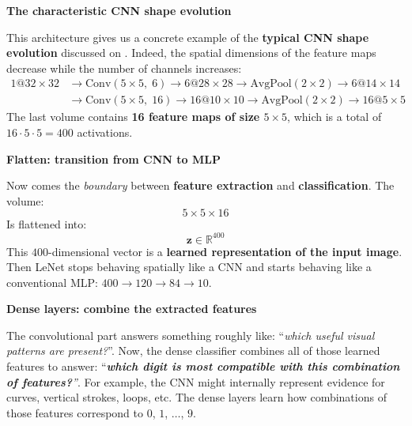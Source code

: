 \highspace
\begin{flushleft}
    \textcolor{Green3}{ \textbf{The characteristic CNN shape evolution}}
\end{flushleft}
This architecture gives us a concrete example of the \textbf{typical CNN shape evolution} discussed on . Indeed, the spatial dimensions of the feature maps decrease while the number of channels increases:
\begin{align*}
    1@32\times32 &\to \text{Conv}(5 \times 5, \; 6) \to 6@28\times28 \to \text{AvgPool}(2 \times 2) \to 6@14\times14 \\
    &\to \text{Conv}(5 \times 5, \; 16) \to 16@10\times10 \to \text{AvgPool}(2 \times 2) \to \boxed{16@5\times5}
\end{align*}
The last volume contains \textbf{16 feature maps of size $5\times5$}, which is a total of $16 \cdot 5 \cdot 5 = 400$ activations.

\highspace
\begin{flushleft}
    \textcolor{Green3}{ \textbf{Flatten: transition from CNN to MLP}}
\end{flushleft}
Now comes the \emph{boundary} between \textbf{feature extraction} and \textbf{classification}. The volume:
\begin{equation*}
    5 \times 5 \times 16
\end{equation*}
Is flattened into:
\begin{equation*}
    \mathbf{z} \in \mathbb{R}^{400}
\end{equation*}
This $400$-dimensional vector is a \textbf{learned representation of the input image}. Then LeNet stops behaving spatially like a CNN and starts behaving like a conventional MLP: $400 \to 120 \to 84 \to 10$.

\highspace
\begin{flushleft}
    \textcolor{Green3}{ \textbf{Dense layers: combine the extracted features}}
\end{flushleft}
The convolutional part answers something roughly like: ``\emph{which useful visual patterns are present?}''. Now, the dense classifier combines all of those learned features to answer: ``\emph{\textbf{which digit is most compatible with this combination of features?}''}. For example, the CNN might internally represent evidence for curves, vertical strokes, loops, etc. The dense layers learn how combinations of those features correspond to $0$, $1$, $\dots$, $9$.

